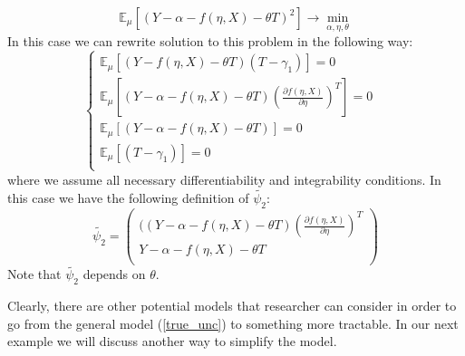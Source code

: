 \documentclass[12pt]{article}
\theoremstyle{plain}
\begin{document}
\begin{equation}
\mathbb{E}_{\mu}\left[\left(Y-\alpha-f(\eta, X) - \theta T\right)^2\right] \rightarrow \min_{\alpha, \eta, \theta}
\end{equation}
In this case we can rewrite solution to this problem in the following way:
\begin{equation}
\begin{cases}
\mathbb{E}_{\mu}\left[(Y-f(\eta,X)-\theta T)(T-\gamma_1)\right]=0&\\
\mathbb{E}_{\mu}\left[(Y-\alpha -f(\eta,X)-\theta T)\left(\frac{\partial f(\eta, X)}{\partial \eta}\right)^T \right]=0 \\
\mathbb{E}_{\mu}\left[(Y-\alpha -f(\eta,X)-\theta T)\right] = 0\\
\mathbb{E}_{\mu}\left[\left(T-\gamma_1\right)\right] = 0\\
\end{cases}
\end{equation}
where we assume all necessary differentiability and integrability conditions. In this case we have the following definition of $\tilde{\psi_2}$:
\begin{equation}\label{psi_unc}
\tilde{\psi_2} = \begin{pmatrix} ((Y-\alpha -f(\eta,X)-\theta T)\left(\frac{\partial f(\eta, X)}{\partial \eta}\right)^T\\
Y-\alpha -f(\eta,X)-\theta T\\
\end{pmatrix}
\end{equation}
Note that $\tilde{\psi_2}$ depends on $\theta$. 

Clearly, there are other potential models that researcher can consider in order to go from the general model (\ref{true_unc}) to something more tractable. In our next example we will discuss another way to simplify the model.
\end{document}
